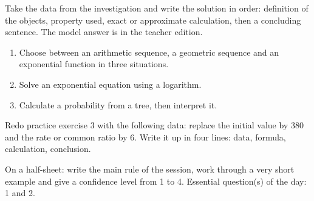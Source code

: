\begin{exemple}
Take the data from the investigation and write the solution in order: definition of the objects, property used, exact or approximate calculation, then a concluding sentence. The model answer is in the teacher edition.
\end{exemple}

\begin{exercice}[-- essential]
\begin{enumerate}\item Choose between an arithmetic sequence, a geometric sequence and an exponential function in three situations.\item Solve an exponential equation using a logarithm.\item Calculate a probability from a tree, then interpret it.\end{enumerate}
\end{exercice}


\begin{dm}Redo practice exercise 3 with the following data: replace the initial value by $380$ and the rate or common ratio by $6$. Write it up in four lines: data, formula, calculation, conclusion.\end{dm}

\begin{sortie}On a half-sheet: write the main rule of the session, work through a very short example and give a confidence level from 1 to 4. Essential question(s) of the day: 1 and 2.\end{sortie}


